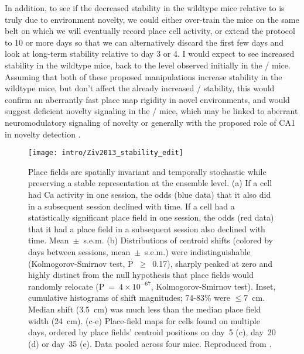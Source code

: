 In addition, to see if the decreased stability in the wildtype mice relative to \citeauthor{Ziv2013} is truly due to environment novelty, we could either over-train the mice on the same belt on which we will eventually record place cell activity, or extend the protocol to 10 or more days so that we can alternatively discard the first few days and look at long-term stability relative to day 3 or 4.
I would expect to see increased stability in the wildtype mice, back to the level observed initially in the \df/ mice.
Assuming that both of these proposed manipulations increase stability in the wildtype mice, but don't affect the already increased \df/ stability, this would confirm an aberrantly fast place map rigidity in novel environments, and would suggest deficient novelty signaling in the \df/ mice, which may be linked to aberrant neuromodulatory signaling of novelty or generally with the proposed role of CA1 in novelty detection \citep{Li2003d}\citep{Barry2012c}\citep{Larkin2014}\citep{Nitz2004}.

\begin{figure}
	\centering
	\texttt{[image: intro/Ziv2013\_stability\_edit]}
	\caption[Place field stability in Ziv et al.]{Place fields are spatially invariant and temporally stochastic while preserving a stable representation at the ensemble level.
	(a) If a cell had Ca activity in one session, the odds (blue data) that it also did in a subsequent session declined with time. If a cell had a statistically significant place field in one session, the odds (red data) that it had a place field in a subsequent session also declined with time. Mean~$\pm$~s.e.m.
	(b) Distributions of centroid shifts (colored by days between sessions, mean~$\pm$~s.e.m.) were indistinguishable (Kolmogorov-Smirnov test, P~$\geq$~0.17), sharply peaked at zero and highly distinct from the null hypothesis that place fields would randomly relocate (P~=~$4\times10^{-67}$, Kolmogorov-Smirnov test). Inset, cumulative histograms of shift magnitudes; 74-83\% were $\leq$7~cm. Median shift (3.5~cm) was much less than the median place field width (24~cm).
	(c-e) Place-field maps for cells found on multiple days, ordered by place fields' centroid positions on day~5 (c), day~20 (d) or day~35 (e). Data pooled across four mice.
	Reproduced from \citet{Ziv2013}.}
	\label{fig:conclusions:ziv_stability}
\end{figure}

